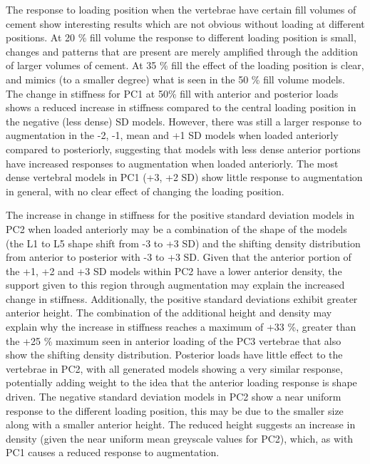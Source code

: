 The response to loading position when the vertebrae have certain fill volumes
of cement show interesting results which are not obvious without loading at
different positions.  At 20 \% fill volume the response to different loading
position is small, changes and patterns that are present are merely amplified
through the addition of larger volumes of cement.  At 35 \% fill the effect of
the loading position is clear, and mimics (to a smaller degree) what is seen in
the 50 \% fill volume models.  The change in stiffness for PC1 at 50\% fill
with anterior and posterior loads shows a reduced increase in stiffness
compared to the central loading position in the negative (less dense) SD
models.  However, there was still a larger response to augmentation in the -2,
-1, mean and +1 SD models when loaded anteriorly compared to posteriorly,
suggesting that models with less dense anterior portions have increased
responses to augmentation when loaded anteriorly.  The most dense vertebral
models in PC1 (+3, +2 SD) show little response to augmentation in general, with
no clear effect of changing the loading position.

The increase in change in stiffness for the positive standard deviation models
in PC2 when loaded anteriorly may be a combination of the shape of the models
(the L1 to L5 shape shift from -3 to +3 SD) and the shifting density
distribution from anterior to posterior with -3 to +3 SD.  Given that the
anterior portion of the +1, +2 and +3 SD models within PC2 have a lower
anterior density, the support given to this region through augmentation may
explain the increased change in stiffness.  Additionally, the positive standard
deviations exhibit greater anterior height.  The combination of the additional
height and density may explain why the increase in stiffness reaches a maximum
of +33 \%, greater than the +25 \% maximum seen in anterior loading of the PC3
vertebrae that also show the shifting density distribution.  Posterior loads
have little effect to the vertebrae in PC2, with all generated models showing a
very similar response, potentially adding weight to the idea that the anterior
loading response is shape driven.  The negative standard deviation models in
PC2 show a near uniform response to the different loading position, this may be
due to the smaller size along with a smaller anterior height.  The reduced
height suggests an increase in density (given the near uniform mean greyscale
values for PC2), which, as with PC1 causes a reduced response to augmentation.

